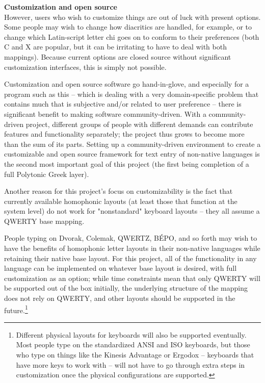 \documentclass[11pt]{article}
\begin{document}
\noindent \textbf{Customization and open source} \\

However, users who wish to customize things are out of luck with present options. Some people may wish to change how diacritics are handled, for example, or to change which Latin-script letter chi goes on to conform to their preferences (both C and X are popular, but it can be irritating to have to deal with both mappings). Because current options are closed source without significant customization interfaces, this is simply not possible.

Customization and open source software go hand-in-glove, and especially for a program such as this -- which is dealing with a very domain-specific problem that contains much that is subjective and/or related to user preference -- there is significant benefit to making software community-driven. With a community-driven project, different groups of people with different demands can contribute features and functionality separately; the project thus grows to become more than the sum of its parts. Setting up a community-driven environment to create a customizable and open source framework for text entry of non-native languages is the second most important goal of this project (the first being completion of a full Polytonic Greek layer).

Another reason for this project's focus on customizability is the fact that currently available homophonic layouts (at least those that function at the system level) do not work for "nonstandard" keyboard layouts -- they all assume a QWERTY base mapping.

People typing on Dvorak, Colemak, QWERTZ, BÉPO, and so forth may wish to have the benefits of homophonic letter layouts in their non-native languages while retaining their native base layout. For this project, all of the functionality in any language can be implemented on whatever base layout is desired, with full customization as an option; while time constraints mean that only QWERTY will be supported out of the box initially, the underlying structure of the mapping does not rely on QWERTY, and other layouts should be supported in the future.\footnote{Different physical layouts for keyboards will also be supported eventually. Most people type on the standardized ANSI and ISO keyboards, but those who type on things like the Kinesis Advantage or Ergodox -- keyboards that have more keys to work with -- will not have to go through extra steps in customization once the physical configurations are supported.}
\end{document}
